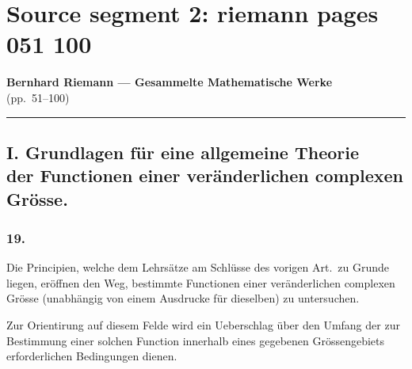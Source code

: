 \documentclass[12pt,a4paper]{book}
\theoremstyle{definition}
\theoremstyle{remark}
\begin{document}
\clearpage
\chapter*{Source segment 2: riemann pages 051 100}

\begin{center}
{\LARGE\bfseries Bernhard Riemann --- Gesammelte Mathematische Werke}\\[0.5em]
{\large (pp.~51--100)}\\[1em]
\rule{\textwidth}{0.4pt}
\end{center}

\vspace{1em}


\section*{I. Grundlagen für eine allgemeine Theorie\\
der Functionen einer veränderlichen complexen Grösse.}


\subsection*{19.}

Die Principien, welche dem Lehrsätze am Schlüsse des vorigen Art.\ zu Grunde liegen, eröffnen den Weg, bestimmte Functionen einer veränderlichen complexen Grösse (unabhängig von einem Ausdrucke für dieselben) zu untersuchen.

Zur Orientirung auf diesem Felde wird ein Ueberschlag über den Umfang der zur Bestimmung einer solchen Function innerhalb eines gegebenen Grössengebiets erforderlichen Bedingungen dienen.
\end{document}

